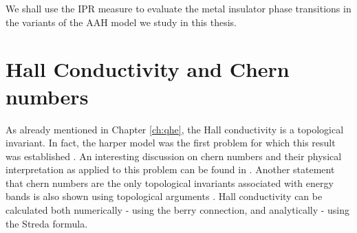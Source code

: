 We shall use the IPR measure to evaluate the metal insulator phase transitions in the variants of the AAH model we study in this thesis.

\section{Hall Conductivity and Chern numbers}
As already mentioned in Chapter \ref{ch:qhe}, the Hall conductivity is a topological invariant. In fact, the harper model was  the first problem for which this result was established \cite{thouless1982quantized}. An interesting
discussion on chern numbers and their physical interpretation as applied to this problem can be found in \parencite{wen1989winding}. Another statement that chern numbers 
are the only topological invariants associated with energy bands is also shown using topological arguments \cite{avron1983homotopy}.
Hall conductivity can be calculated both numerically - using the berry connection, and analytically - using the Streda formula.

